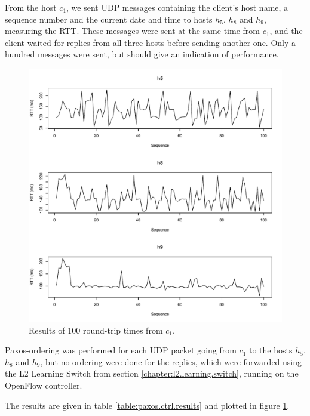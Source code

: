 From the host $c_1$, we sent UDP messages containing the client's host name,
a sequence number and the current date and time to hosts $h_5$, $h_8$
and $h_9$, measuring the \acf{RTT}.  These messages were sent at the same
time from $c_1$, and the client waited for replies from all three hosts
before sending another one.  Only a hundred messages were sent, but should
give an indication of performance.

\begin{figure}
  \centering
  \includegraphics[width=\textwidth]{rtt-hosts.pdf}
  \caption{Results of 100 round-trip times from $c_1$.}
  \label{figure:paxos.ctrl.results}
\end{figure}

Paxos-ordering was performed for each UDP packet going from $c_1$ to the
hosts $h_5$, $h_8$ and $h_9$, but no ordering were done for the replies,
which were forwarded using the L2 Learning Switch from section
\vref{chapter:l2.learning.switch}, running on the
OpenFlow controller.

The results are given in table \ref{table:paxos.ctrl.results} and plotted in
figure \ref{figure:paxos.ctrl.results}.

